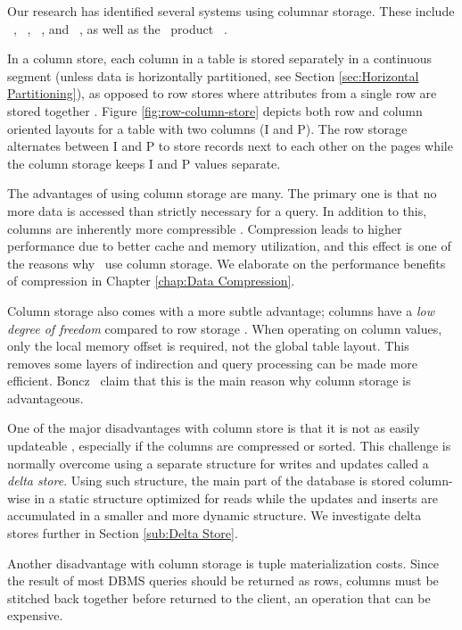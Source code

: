 Our research has identified several systems using columnar storage. These include \monetdb~\cite{Boncz2005-wj, Boncz2002-yj}, \cstore~\cite{Stonebraker2005-qz}, \saph~\cite{Farber2012-vh}, and \mssql~\cite{noauthor_undated-vq, Larson2013-mc}, as well as the \bd~product \tableau~\cite{Kamkolkar2015-iq}.

In a column store, each column in a table is stored separately in a continuous segment (unless data is horizontally partitioned, see Section \ref{sec:Horizontal Partitioning}), as opposed to row stores where attributes from a single row are stored together \cite{Bjorklund2011-wh}. Figure \ref{fig:row-column-store} depicts both row and column oriented layouts for a table with two columns (I and P). The row storage alternates between I and P to store records next to each other on the pages while the column storage keeps I and P values separate. 

The advantages of using column storage are many. The primary one is that no more data is accessed than strictly necessary for a query. In addition to this, columns are inherently more compressible \cite{noauthor_undated-vq}. Compression leads to higher performance due to better cache and memory utilization, and this effect is one of the reasons why \mssql~use column storage. We elaborate on the performance benefits of compression in Chapter \ref{chap:Data Compression}.

Column storage also comes with a more subtle advantage; columns have a \textit{low degree of freedom} compared to row storage \cite{Boncz2005-wj}. When operating on column values, only the local memory offset is required, not the global table layout. This removes some layers of indirection and query processing can be made more efficient. Boncz \ea~claim that this is the main reason why column storage is advantageous.


One of the major disadvantages with column store is that it is not as easily updateable \cite{Bjorklund2011-wh}, especially if the columns are compressed or sorted. This challenge is normally overcome using a separate structure for writes and updates called a \textit{delta store}. Using such structure, the main part of the database is stored column-wise in a static structure optimized for reads while the updates and inserts are accumulated in a smaller and more dynamic structure. We investigate delta stores further in Section \ref{sub:Delta Store}.

Another disadvantage with column storage is tuple materialization costs. Since the result of most DBMS queries should be returned as rows, columns must be stitched back together before returned to the client, an operation that can be expensive.


